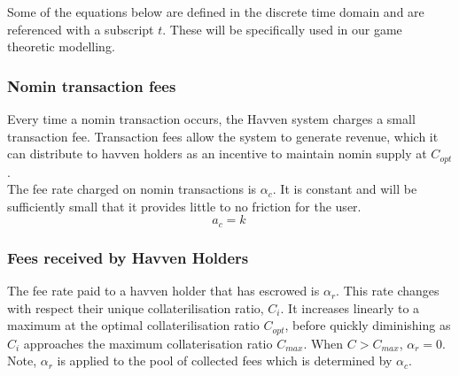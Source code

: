 \noindent Some of the equations below are defined in the discrete time domain and are referenced with a subscript $t$. These will be specifically used in our game theoretic modelling.

\subsubsection{Nomin transaction fees} Every time a nomin transaction occurs, the Havven system charges a small transaction fee. Transaction fees allow the system to generate revenue, which it can distribute to havven holders as an incentive to maintain nomin supply at $C_{opt}$. \\

\noindent The fee rate charged on nomin transactions is $\alpha_c$. It is constant and will be sufficiently small that it provides little to no friction for the user.\\

\begin{equation}
a_c = k \ \label{eq:5}
\end{equation}

\begin{center}
\end{center}

\newpage
\subsubsection{Fees received by Havven Holders}

\noindent The fee rate paid to a havven holder that has escrowed is $\alpha_r$. This rate changes with respect their unique collaterilisation ratio, $C_i$. It increases linearly to a maximum at the optimal collaterilisation ratio $C_{opt}$, before quickly diminishing as $C_i$ approaches the maximum collaterisation ratio $C_{max}$. When $C > C_{max}$, $\alpha_r = 0$. Note, $\alpha_r$ is applied to the pool of collected fees which is determined by $\alpha_c$. \\

